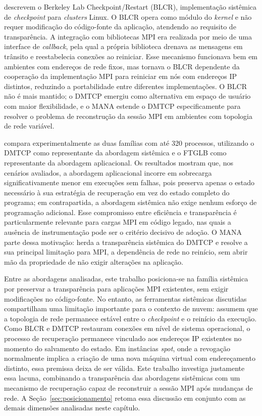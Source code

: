  descrevem o Berkeley Lab Checkpoint/Restart
(BLCR), implementação sistêmica de \textit{checkpoint} para \textit{clusters} Linux.
O BLCR opera como módulo do \textit{kernel} e não requer modificação do
código-fonte da aplicação, atendendo ao requisito de transparência. A
integração com bibliotecas MPI era realizada por meio de uma interface de
\textit{callback}, pela qual a própria biblioteca drenava as mensagens em
trânsito e reestabelecia conexões ao reiniciar. Esse mecanismo funcionava bem
em ambientes com endereços de rede fixos, mas tornava o BLCR dependente da
cooperação da implementação MPI para reiniciar em nós com endereços IP
distintos, reduzindo a portabilidade entre diferentes implementações. O BLCR
não é mais mantido; o DMTCP emergiu como alternativa em espaço de usuário com
maior flexibilidade, e o MANA estende o DMTCP especificamente para resolver
o problema de reconstrução da sessão MPI em ambientes com topologia de rede
variável.

 compara experimentalmente as duas famílias com
até 320 processos, utilizando o DMTCP como representante da abordagem sistêmica
e o FTGLB como representante da abordagem aplicacional. Os resultados mostram
que, nos cenários avaliados, a abordagem aplicacional incorre em sobrecarga
significativamente menor em execuções sem falhas, pois preserva apenas o estado
necessário à sua estratégia de recuperação em vez do estado completo do
programa; em contrapartida, a abordagem sistêmica não exige nenhum esforço de
programação adicional. Esse compromisso entre eficiência e transparência é
particularmente relevante para cargas MPI em código legado, nas quais a
ausência de instrumentação pode ser o critério decisivo de adoção. O MANA parte
dessa motivação: herda a transparência sistêmica do DMTCP e resolve a sua
principal limitação para MPI, a dependência de rede no reinício, sem abrir
mão da propriedade de não exigir alterações na aplicação.

Entre as abordagens analisadas, este trabalho posiciona-se na família sistêmica
por preservar a transparência para aplicações MPI existentes, sem exigir modificações
no código-fonte. No entanto, as ferramentas sistêmicas discutidas compartilham
uma limitação importante para o contexto de nuvem: assumem que a topologia de rede
permanece estável entre o \textit{checkpoint} e o reinício da execução.
Como BLCR e DMTCP restauram conexões em nível de sistema operacional, o processo
de recuperação permanece vinculado aos endereços IP existentes no momento do
salvamento do estado. Em instâncias \textit{spot}, onde a revogação normalmente
implica a criação de uma nova máquina virtual com endereçamento distinto, essa
premissa deixa de ser válida. Este trabalho investiga justamente essa lacuna,
combinando a transparência das abordagens sistêmicas com um mecanismo de recuperação
capaz de reconstruir a sessão MPI após mudanças de rede. A Seção~\ref{sec:posicionamento}
retoma essa discussão em conjunto com as demais dimensões analisadas neste capítulo.

